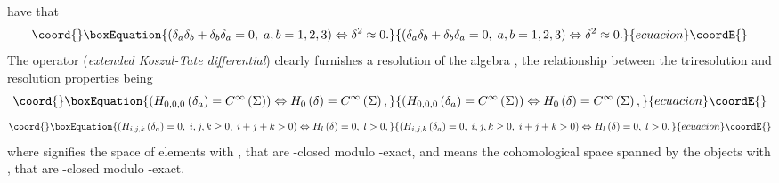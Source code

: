 \documentclass[a4paper,12pt]{article}
\begin{document}
have that 
\begin{equation}\coord{}\boxEquation{
\left( \delta _{a}\delta _{b}+\delta _{b}\delta _{a}=0,\;a,b=1,2,3\right)
\Leftrightarrow \delta ^{2}\approx 0.  \label{sp3.h}
}{
\left( \delta _{a}\delta _{b}+\delta _{b}\delta _{a}=0,\;a,b=1,2,3\right)
\Leftrightarrow \delta ^{2}\approx 0.  }{ecuacion}\coordE{}\end{equation}
The operator \myHighlight{$\delta $}\coordHE{} (\textit{extended Koszul-Tate differential}) clearly
furnishes a resolution of the algebra \coordHE{},
the relationship between the triresolution and resolution properties being 
\begin{equation}\coord{}\boxEquation{
\left( H_{0,0,0}\left( \delta _{a}\right) =C^{\infty }\left( \Sigma \right)
\right) \Leftrightarrow H_{0}\left( \delta \right) =C^{\infty }\left( \Sigma
\right) ,  \label{sp3.i}
}{
\left( H_{0,0,0}\left( \delta _{a}\right) =C^{\infty }\left( \Sigma \right)
\right) \Leftrightarrow H_{0}\left( \delta \right) =C^{\infty }\left( \Sigma
\right) ,  }{ecuacion}\coordE{}\end{equation}
\begin{equation}\coord{}\boxEquation{
\left( H_{i,j,k}\left( \delta _{a}\right) =0,\;i,j,k\geq 0,\;i+j+k>0\right)
\Leftrightarrow H_{l}\left( \delta \right) =0,\;l>0,  \label{sp3.i1}
}{
\left( H_{i,j,k}\left( \delta _{a}\right) =0,\;i,j,k\geq 0,\;i+j+k>0\right)
\Leftrightarrow H_{l}\left( \delta \right) =0,\;l>0,  }{ecuacion}\coordE{}\end{equation}
where \coordHE{} signifies the space of elements \coordHE{} with \coordHE{}, that are \coordHE{}%
-closed modulo \coordHE{}-exact, and \coordHE{} means
the cohomological space spanned by the objects \coordHE{} with \coordHE{},
that are \myHighlight{$\delta $}\coordHE{}-closed modulo \myHighlight{$\delta $}\coordHE{}-exact.
\end{document}
